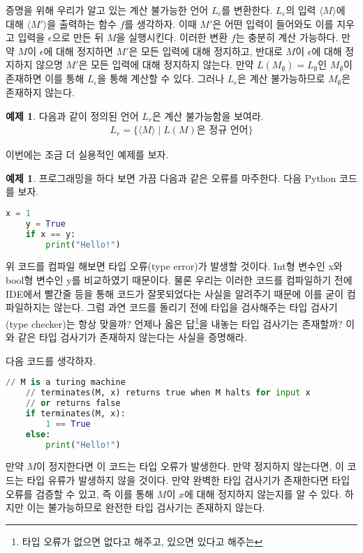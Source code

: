 \documentclass[b5paper, 11pt]{book}
\theoremstyle{definition}
\newtheorem{ex}[defn]{예제}
\newenvironment{pf*}{\pushQED{\qed}\pf}
{\popQED\endpf}
\begin{document}
\begin{pf*}
    증명을 위해 우리가 알고 있는 계산 불가능한 언어 $L_\epsilon$를 변환한다. 
    $L_\epsilon$의 입력 $\langle M \rangle$에 대해 $\langle M' \rangle$을 
    출력하는 함수 $f$를 생각하자. 이때 $M'$은 어떤 입력이 들어와도 이를 지우고
    입력을 $\epsilon$으로 만든 뒤 $M$을 실행시킨다. 이러한 변환 $f$는 충분히
    계산 가능하다. 만약 $M$이 $\epsilon$에 대해 정지하면 $M'$은 모든 입력에 대해
    정지하고, 반대로 $M$이 $\epsilon$에 대해 정지하지 않으명 $M'$은 모든 입력에
    대해 정지하지 않는다. 만약 $L(M_\emptyset) = L_\emptyset$인 $M_\emptyset$이
    존재하면 이를 통해 $L_\epsilon$을 통해 계산할 수 있다. 그러나 $L_\epsilon$은
    계산 불가능하므로 $M_\emptyset$은 존재하지 않는다.
\end{pf*}
\begin{ex}
    다음과 같이 정의된 언어 $L_r$은 계산 불가능함을 보여라.
    \begin{align*}
        L_r = \{ \langle M \rangle \;\vert\; L(M) \text{은 정규 언어} \}
    \end{align*}
\end{ex}
이번에는 조금 더 실용적인 예제를 보자. 
\begin{ex}
    프로그래밍을 하다 보면 가끔 다음과 같은 오류를 마주한다. 다음 Python 코드를 보자.
\begin{lstlisting}[language=Python]
    x = 1 
    y = True
    if x == y:
        print("Hello!")
\end{lstlisting}
    위 코드를 컴파일 해보면 타입 오류(type error)가 발생할 것이다. Int형 변수인 x와 bool형 변수인 y를 비교하였기 때문이다. 물론 우리는 이러한 코드를 컴파일하기 전에 IDE에서 빨간줄 등을 통해 코드가 잘못되었다는 사실을 알려주기 때문에 이를 굳이 컴파일하지는 않는다. 그럼 과연 코드를 돌리기 전에 타입을 검사해주는 타입 검사기(type checker)는 항상 맞을까? 언제나 옳은 답\footnote{타입 오류가 없으면 없다고 해주고, 있으면 있다고 해주는}을 내놓는 타입 검사기는 존재할까? 이와 같은 타입 검사기가 존재하지 않는다는 사실을 증명해라. 
\end{ex}
\begin{pf*}
    다음 코드를 생각하자. 
\begin{lstlisting}[language=Python]
    // M is a turing machine
    // terminates(M, x) returns true when M halts for input x
    // or returns false 
    if terminates(M, x):
        1 == True 
    else:
        print("Hello!")
\end{lstlisting}
만약 $M$이 정지한다면 이 코드는 타입 오류가 발생한다. 만약 정지하지 않는다면, 이 코드는 타입 유류가 발생하지 않을 것이다. 만약 완벽한 타입 검사기가 존재한다면 타입 오류를 검증할 수 있고, 즉 이를 통해 $M$이 $x$에 대해 정지하지 않는지를 알 수 있다. 하지만 이는 불가능하므로 완전한 타입 검사기는 존재하지 않는다. 
\end{pf*}
\end{document}
